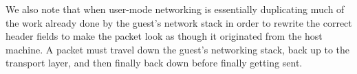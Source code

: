 We also note that when user-mode networking is essentially duplicating much of the work already done by the guest's network stack in order to rewrite the correct header fields to make the packet
look as though it originated from the host machine.
A packet must travel down the guest's networking stack, back up to the transport layer, and then finally back down before finally getting sent.


